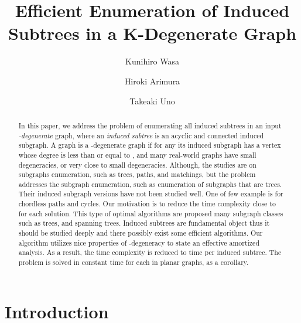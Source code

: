 \documentclass{llncs}
\newcommand{\name}[1]{\textit{#1}}
\begin{document}
\title{Efficient Enumeration of Induced Subtrees in a K-Degenerate Graph}


\author{Kunihiro Wasa \and Hiroki Arimura \and Takeaki Uno}
\maketitle

\begin{abstract}
    In this paper, 
    we address the problem of  
    enumerating all induced subtrees 
    in an input \name{-degenerate} graph, 
    where an \name{induced subtree} is 
    an acyclic and connected induced subgraph. 
    A graph  is a -degenerate graph 
    if for any its induced subgraph has a vertex 
    whose degree is less than or equal to , 
    and many real-world graphs have small degeneracies, 
    or very close to small degeneracies. 
    Although, the studies are on subgraphs enumeration, 
    such as trees, paths, and matchings, 
    but the problem addresses the subgraph
    enumeration, such as enumeration of subgraphs that are trees.
    Their induced subgraph versions have not been studied well.
    One of few example is for chordless paths and cycles.
    Our motivation is to reduce 
    the time complexity close to  for each solution. 
    This type of optimal algorithms are proposed 
    many subgraph classes such as trees, and spanning trees. 
    Induced subtrees are fundamental object 
    thus it should be studied deeply 
    and there possibly exist some efficient algorithms. 
    Our algorithm utilizes nice properties of -degeneracy 
    to state an effective amortized analysis. 
    As a result, the time complexity is reduced to 
     time per induced subtree. 
    The problem is solved in constant time for each in
    planar graphs, as a corollary. 
\end{abstract}




\section{Introduction}
\end{document}
